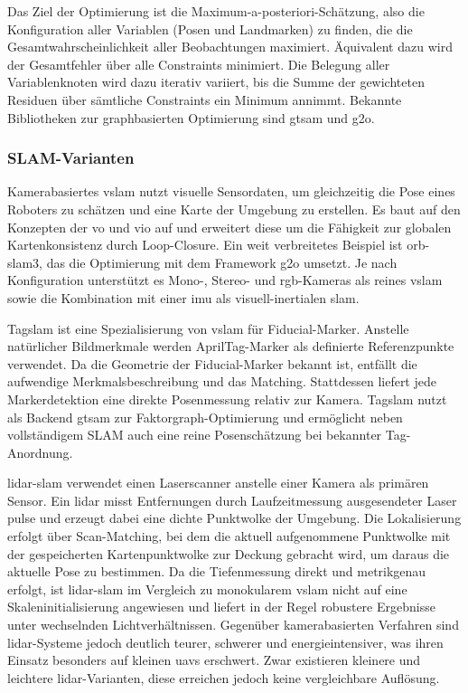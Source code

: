 Das Ziel der Optimierung ist die Maximum-a-posteriori-Schätzung, also die Konfiguration aller Variablen (Posen und Landmarken) zu finden, die die 
Gesamtwahrscheinlichkeit aller Beobachtungen maximiert. Äquivalent dazu wird der Gesamtfehler über alle Constraints minimiert.
Die Belegung aller Variablenknoten wird dazu iterativ variiert, bis die Summe der gewichteten Residuen über sämtliche Constraints ein Minimum annimmt.
Bekannte Bibliotheken zur graphbasierten Optimierung sind \gls{gtsam} und \gls{g2o}.~\cite{dellaert2012factor}


\subsubsection*{SLAM-Varianten}
\label{sec:slam_varianten}
Kamerabasiertes \gls{vslam} nutzt visuelle Sensordaten, um gleichzeitig die Pose eines Roboters zu schätzen und eine Karte der 
Umgebung zu erstellen.
Es baut auf den Konzepten der \gls{vo} und \gls{vio} auf und erweitert diese um die Fähigkeit zur globalen Kartenkonsistenz durch Loop-Closure.
Ein weit verbreitetes Beispiel ist \gls{orb-slam3}, das die Optimierung mit dem Framework \gls{g2o} umsetzt.
Je nach Konfiguration unterstützt es Mono-, Stereo- und \gls{rgb}-Kameras 
als reines \gls{vslam} sowie die Kombination mit einer \gls{imu} als visuell-inertialen \gls{slam}.~\cite{10169695,Cai2024}

Tag\gls{slam} ist eine Spezialisierung von \gls{vslam} für Fiducial-Marker.
Anstelle natürlicher Bildmerkmale werden AprilTag-Marker als definierte 
Referenzpunkte verwendet.
Da die Geometrie der Fiducial-Marker bekannt ist, entfällt die aufwendige Merkmalsbeschreibung und das Matching.
Stattdessen liefert jede Markerdetektion eine direkte Posenmessung relativ zur Kamera.
Tag\gls{slam} nutzt als Backend \gls{gtsam} zur Faktorgraph-Optimierung und ermöglicht neben vollständigem SLAM auch eine reine Posenschätzung bei bekannter Tag-Anordnung.~\cite{pfrommer2019tagslam}


\gls{lidar}-\gls{slam} verwendet einen Laserscanner anstelle einer Kamera als primären Sensor.
Ein \gls{lidar} misst Entfernungen durch Laufzeitmessung ausgesendeter Laser pulse 
und erzeugt dabei eine dichte Punktwolke der Umgebung.
Die Lokalisierung erfolgt über Scan-Matching, bei dem die aktuell aufgenommene Punktwolke mit der gespeicherten Kartenpunktwolke zur 
Deckung gebracht wird, um daraus die aktuelle Pose zu bestimmen.
Da die Tiefenmessung direkt und metrikgenau erfolgt, ist \gls{lidar}-\gls{slam} im 
Vergleich zu monokularem \gls{vslam} nicht auf eine Skaleninitialisierung angewiesen und liefert in der Regel robustere Ergebnisse unter 
wechselnden Lichtverhältnissen.
Gegenüber kamerabasierten Verfahren sind \gls{lidar}-Systeme jedoch deutlich teurer, schwerer und energieintensiver, 
was ihren Einsatz besonders auf kleinen \glspl{uav} erschwert.
Zwar existieren kleinere und leichtere \gls{lidar}-Varianten, diese erreichen jedoch keine vergleichbare Auflösung.~\cite{Yue2023}



